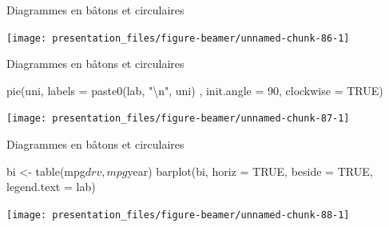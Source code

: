 \documentclass[12pt,handout,ignorenonframetext,]{beamer}
\newenvironment{Shaded}{}{}
\newcommand{\KeywordTok}[1]{\textcolor[rgb]{0.00,0.00,1.00}{{#1}}}
\newcommand{\DataTypeTok}[1]{{#1}}
\newcommand{\DecValTok}[1]{{#1}}
\newcommand{\CharTok}[1]{\textcolor[rgb]{0.00,0.50,0.50}{{#1}}}
\newcommand{\StringTok}[1]{\textcolor[rgb]{0.00,0.50,0.50}{{#1}}}
\newcommand{\OtherTok}[1]{\textcolor[rgb]{1.00,0.25,0.00}{{#1}}}
\newcommand{\NormalTok}[1]{{#1}}
\renewenvironment{Shaded}{\begin{snugshade}}{\end{snugshade}}
\begin{document}
\begin{frame}[fragile]{Diagrammes en bâtons et circulaires}

\centering \footnotesize

\begin{Shaded}
\end{Shaded}

\texttt{[image: presentation\_files/figure-beamer/unnamed-chunk-86-1]}

\end{frame}

\begin{frame}[fragile]{Diagrammes en bâtons et circulaires}

\centering \footnotesize

\begin{Shaded}
\begin{Highlighting}[]
\KeywordTok{pie}\NormalTok{(uni, }\DataTypeTok{labels =} \KeywordTok{paste0}\NormalTok{(lab, }\StringTok{"}\CharTok{\textbackslash{}n}\StringTok{"}\NormalTok{, uni)}
    \NormalTok{, }\DataTypeTok{init.angle =} \DecValTok{90}\NormalTok{, }\DataTypeTok{clockwise =} \OtherTok{TRUE}\NormalTok{)}
\end{Highlighting}
\end{Shaded}

\texttt{[image: presentation\_files/figure-beamer/unnamed-chunk-87-1]}

\end{frame}

\begin{frame}[fragile]{Diagrammes en bâtons et circulaires}

\centering \footnotesize

\begin{Shaded}
\begin{Highlighting}[]
\NormalTok{bi <-}\StringTok{ }\KeywordTok{table}\NormalTok{(mpg$drv, mpg$year)}
\KeywordTok{barplot}\NormalTok{(bi, }\DataTypeTok{horiz =} \OtherTok{TRUE}\NormalTok{, }\DataTypeTok{beside =} \OtherTok{TRUE}\NormalTok{, }\DataTypeTok{legend.text =} \NormalTok{lab)}
\end{Highlighting}
\end{Shaded}

\texttt{[image: presentation\_files/figure-beamer/unnamed-chunk-88-1]}

\end{frame}
\end{document}
